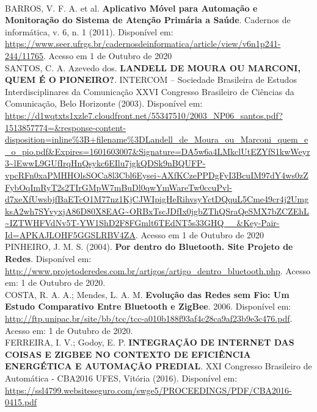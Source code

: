 \documentclass{article}
\begin{document}
\newline
\\
BARROS, V. F. A. et al. \textbf{Aplicativo Móvel para Automação e Monitoração do Sistema de Atenção Primária a Saúde}. Cadernos de informática, v. 6, n. 1 (2011). Disponível em: \url{https://www.seer.ufrgs.br/cadernosdeinformatica/article/view/v6n1p241-244/11765}. Acesso em 1 de Outubro de 2020
\newline
\\
SANTOS, C. A. Azevedo dos. \textbf{LANDELL DE MOURA OU MARCONI, QUEM É O PIONEIRO?}. INTERCOM – Sociedade Brasileira de Estudos Interdisciplinares da Comunicação XXVI Congresso Brasileiro de Ciências da Comunicação, Belo Horizonte (2003).  Disponível em: \url{https://d1wqtxts1xzle7.cloudfront.net/55347510/2003_NP06_santos.pdf?1513857774=&response-content-disposition=inline\%3B+filename\%3DLandell_de_Moura_ou_Marconi_quem_e_o_pio.pdf&Expires=1601603007&Signature=DA5w6a4LMkclUtEZYfS1kwWeyr3~lEwwL9GUfIrqHnQsykc6EIlu7jgkQDSk9nBQUFP-vpcRFn0xaPMHHOlsSOCa8l3Cbl6Eysei~AXfKCzePPDgFyI3BcuIM97dY4ws0zZFybOqImRyT2s2TIrGMpW7mBuDl0qwYmWareTw0ccuPvl-d7xeXfUwsbjfBaETcO1M77nz1KjCJWIpigHeRihvsyYctDQquL5Cme49cr4j2UmgksA2wh7SYvyxjA86D80X8EAG~ORBxTscJDfIx0jgbZThQSraQeSMX7bZCZEhL~IZTWHFVdNv5T-YW1ShD2F8FGmlt6TEdNT5s33GHQ__&Key-Pair-Id=APKAJLOHF5GGSLRBV4ZA}. Acesso em 1 de Outubro de 2020
\newline
\\
PINHEIRO, J. M. S. (2004). \textbf{Por dentro do Bluetooth. Site Projeto de Redes}. Disponível em: \url{http://www.projetoderedes.com.br/artigos/artigo_dentro_bluetooth.php}. Acesso em: 1 de Outubro de 2020.
\newline
\\
COSTA, R. A. A.; Mendes, L. A. M. \textbf{Evolução das Redes sem Fio: Um Estudo Comparativo Entre Bluetooth e ZigBee}. 2006. Disponível em: \url{http://ftp.unipac.br/site/bb/tcc/tcc-a010b188f93af4c28ca9af23b9e3c476.pdf}. Acesso em: 1 de Outubro de 2020.
\newline
\\
FERREIRA, I. V.; Godoy, E. P. \textbf{INTEGRAÇÃO DE INTERNET DAS COISAS E ZIGBEE NO CONTEXTO DE EFICIÊNCIA ENERGÉTICA E AUTOMAÇÃO PREDIAL}. XXI Congresso Brasileiro de Automática - CBA2016 UFES, Vitória (2016). Disponível em: \url{https://ssl4799.websiteseguro.com/swge5/PROCEEDINGS/PDF/CBA2016-0415.pdf}

\end{document}
